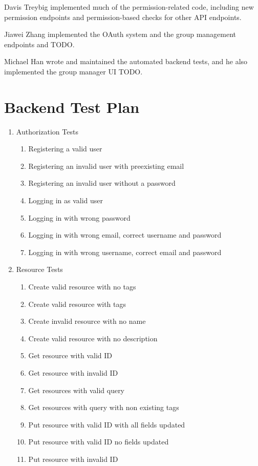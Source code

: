 \documentclass[12pt]{article}
\begin{document}
Davis Treybig implemented much of the permission-related code, including new permission endpoints and permission-based checks for other API endpoints. 

Jiawei Zhang implemented the OAuth system and the group management endpoints and TODO.

Michael Han wrote and maintained the automated backend tests, and he also implemented the group manager UI TODO.

\clearpage
\appendix
\section{Backend Test Plan}
\label{appendix:backendtest}
\begin{enumerate}
	\item Authorization Tests
	\begin{enumerate}
		\item Registering a valid user
		\item Registering an invalid user with preexisting email
		\item Registering an invalid user without a password
		\item Logging in as valid user
		\item Logging in with wrong password
		\item Logging in with wrong email, correct username and password
		\item Logging in with wrong username, correct email and password
	\end{enumerate}
	\item Resource Tests
	\begin{enumerate}
		\item Create valid resource with no tags
		\item Create valid resource with tags
		\item Create invalid resource with no name
		\item Create valid resource with no description 
		\item Get resource with valid ID
		\item Get resource with invalid ID
		\item Get resources with valid query
		\item Get resources with query with non existing tags
		\item Put resource with valid ID with all fields updated
		\item Put resource with valid ID no fields updated
		\item Put resource with invalid ID

\end{enumerate}
\end{enumerate}
\end{document}
